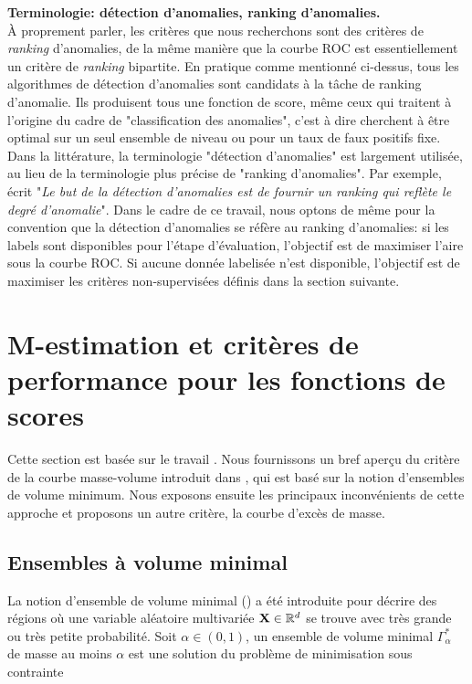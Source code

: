 \begin{remarque}{\bf Terminologie: détection d'anomalies, ranking d'anomalies.\\}
À proprement parler, les critères que nous recherchons sont des critères de \emph{ranking} d'anomalies, de la même manière que la courbe ROC est essentiellement un critère de \emph{ranking} bipartite.
%
En pratique comme mentionné ci-dessus, tous les algorithmes de détection d'anomalies sont candidats à la tâche de ranking d'anomalie. Ils produisent tous une fonction de score, même ceux qui traitent à l'origine du cadre de "classification des anomalies", c'est à dire cherchent à être optimal sur un seul ensemble de niveau ou pour un taux de faux positifs fixe.
%
Dans la littérature, la terminologie "détection d'anomalies" est largement utilisée, au lieu de la terminologie plus précise de "ranking d'anomalies". Par exemple, \cite{Liu2008} écrit "\emph{Le but de la détection d'anomalies est de fournir un ranking qui reflète le degré d'anomalie}".
%
Dans le cadre de ce travail, nous optons de même pour la convention que la détection d'anomalies se réfère au ranking d'anomalies: si les labels sont disponibles pour l'étape d'évaluation, l'objectif est de maximiser l'aire sous la courbe ROC. Si aucune donnée labelisée n'est disponible, l'objectif est de maximiser les critères non-supervisées définis dans la section suivante.

\end{remarque}


\section{M-estimation et critères de performance pour les fonctions de scores}
\label{resume_fr:scoring}
Cette section est basée sur le travail \cite{AISTAT15}. Nous fournissons un bref aperçu du critère de la courbe masse-volume introduit dans \cite{CLEM13}, qui est basé sur la notion d'ensembles de volume minimum. Nous exposons ensuite les principaux inconvénients de cette approche et proposons un autre critère, la courbe d'excès de masse.

\subsection{Ensembles à volume minimal}
\label{resume_fr:mv-set}

La notion d'ensemble de volume minimal (\cite{Polonik97, Einmahl1992}) a été introduite pour décrire des régions où une variable aléatoire multivariée $\mathbf X \in \mathbb{R}^d$  se trouve avec très grande ou très petite probabilité. Soit $\alpha \in (0,1)$, un ensemble de volume minimal $\Gamma^*_{\alpha}$ de masse au moins $\alpha $ est une solution du problème de minimisation sous contrainte

